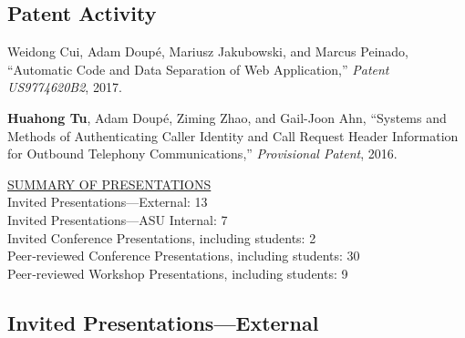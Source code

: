 \documentclass[11pt,letterpaper,sans]{moderncv}
\begin{document}
\subsection{Patent Activity}

\begin{etaremune}

  \item Weidong Cui, Adam Doup\'e, Mariusz Jakubowski, and Marcus
    Peinado, ``Automatic Code and Data Separation of Web
    Application,'' \emph{Patent US9774620B2}, 2017. 

  \item \textbf{Huahong Tu}, Adam Doup\'e, Ziming Zhao,
    and Gail-Joon Ahn, ``Systems and Methods of Authenticating Caller
    Identity and Call Request Header Information for Outbound
    Telephony Communications,'' \emph{Provisional Patent}, 2016.

  
\end{etaremune}




\begin{framed}
\underline{SUMMARY OF PRESENTATIONS} \\
Invited Presentations---External: 13 \\
Invited Presentations---ASU Internal: 7 \\
Invited Conference Presentations, including students: 2 \\
Peer‐reviewed Conference Presentations, including students: 30 \\
Peer‐reviewed Workshop Presentations, including students: 9 \\
\end{framed}

\subsection{Invited Presentations---External}
\end{document}
